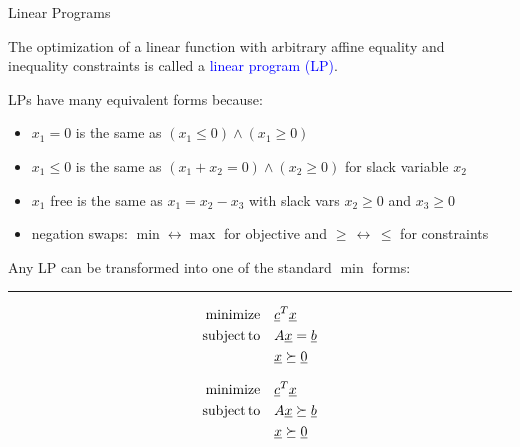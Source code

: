 \documentclass[10pt,english,aspectratio=169]{beamer}
\begin{document}
\begin{frame}{Linear Programs}

The optimization of a linear function with arbitrary affine equality and \\ inequality constraints is called a \textcolor{blue}{linear program (LP)}.

\vspace{3mm}

LPs have many equivalent forms because:
\begin{itemize}

\item $x_1 \!=\! 0$ is the same as $(x_1 \leq 0) \wedge (x_1\geq 0)$
\item $x_1 \leq 0$ is the same as $(x_1 + x_2 = 0) \wedge (x_2 \geq 0)$ for slack variable $x_2$
\item $x_1$ free is the same as $x_1 = x_2 - x_3$ with slack vars $x_2 \geq 0$ and $x_3 \geq 0$
\item negation swaps: $\min \leftrightarrow \max$ for objective and $\geq \,\leftrightarrow\, \leq$ for constraints
\end{itemize}  

\begin{definition}
Any LP can be transformed into one of the standard $\min$ forms: \\[1mm]
\hrule \vspace{0mm}
\begin{minipage}{0.49\textwidth}
\vspace{-2mm}
\begin{align*}
\mathrm{minimize} \quad & \underline{c}^T \underline{x} \\
\mathrm{subject\,to} \quad & A \underline{x} = \underline{b} \\
& \underline{x} \succeq \underline{0}
\end{align*}
\end{minipage}
\vrule
\begin{minipage}{0.49\textwidth}
\vspace{-2mm}
\begin{align*}
\mathrm{minimize} \quad & \underline{c}^T \underline{x} \\
\mathrm{subject\,to} \quad & A \underline{x} \succeq \underline{b} \\
& \underline{x} \succeq \underline{0}
\end{align*}
\end{minipage}
\end{definition}

\end{frame}
\end{document}

